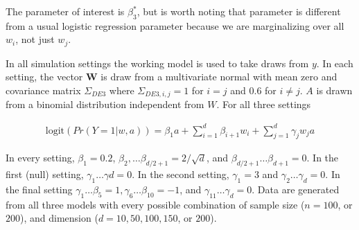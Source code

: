 \documentclass{article}
\newcommand{\sh}{\textcolor{red}}
\begin{document}
The parameter of interest is $\beta_3^*$, but is worth noting that parameter is different from a usual logistic regression parameter because we are marginalizing over all $w_i$, not just $w_j$.

In all simulation settings the working model is used to take draws from $y$. In each setting, the vector $\boldsymbol{W}$ is draw from a multivariate normal with mean zero and covariance matrix $\Sigma_{DE3}$ where $\Sigma_{DE3, i, j} = 1$ for $i = j$ and $0.6$ for $i \neq j$.  $A$ is drawn from a binomial distribution independent from $W$.  For all three settings 

\begin{align*}
	\text{logit}\left(Pr(Y = 1 | w, a)\right) = \beta_1 a + \sum_{i = 1}^{d} \beta_{i + 1} w_i + \sum_{j = 1}^d \gamma_{j} w_j a
\end{align*}

In every setting, $\beta_1 = 0.2$, $\beta_2, \dots \beta_{d/2 + 1} = 2/\sqrt{d}$, and $\beta_{d/2 + 1} \dots \beta_{d + 1} = 0$.  In the first (null) setting, $\gamma_{1} \dots \gamma{d} = 0$.  In the second setting, $\gamma_{1} = 3$ and $\gamma_{2} \dots \gamma_{d} = 0$.  In the final setting $\gamma_{1} \dots \beta_{5} = 1, \gamma_{6} \dots \beta_{10} = -1$, and $\gamma_{11} \dots \gamma_{d} = 0$.
Data are generated from all three models with every possible combination of sample size ($n = 100$, or $200$), and dimension ($d = 10, 50, 100, 150$, or $200$).


\end{document}
